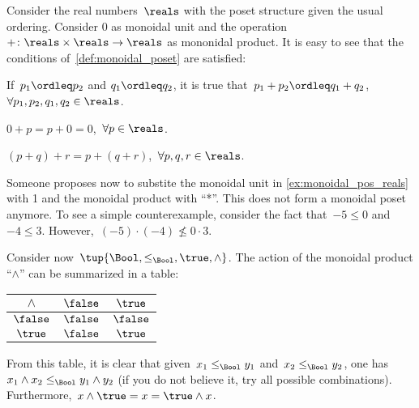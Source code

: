 \begin{example}
    \label{ex:monoidal_pos_reals}
    Consider the real numbers~$\reals$ with the poset structure given the usual ordering. Consider 0 as monoidal unit and the operation~$+\colon \reals\times \reals\to \reals$ as mononidal product. It is easy to see that the conditions of~\cref{def:monoidal_poset} are satisfied:
    \begin{compactenum}[(a)]
        \item If~$p_1\ordleq p_2$ and $q_1\ordleq q_2$, it is true that~$p_1+p_2\ordleq q_1+q_2$,~$\forall p_1,p_2,q_1,q_2\in \reals$.
        \item $0+p=p+0=0$,~$\forall p\in \reals$.
        \item $(p+q)+r=p+(q+r)$,~$\forall p,q,r\in \reals$.
    \end{compactenum}
\end{example}

\begin{example}
    Someone proposes now to substite the monoidal unit in \cref{ex:monoidal_pos_reals} with 1 and the monoidal product with ``*''. This does not form a monoidal poset anymore. To see a simple counterexample, consider the fact that~$-5\leq 0$ and~$-4\leq 3$. However,~$(-5)\cdot (-4) \nleq 0 \cdot 3$.
\end{example}

\begin{example}
    Consider now~$\tup{\Bool,\leq_{\Bool},\true,\wedge}$. The action of the monoidal product ``$\wedge$'' can be summarized in a table:
    \begin{center}
        \begin{tabular}{c|cc}
            $\wedge$ & $\false$ & $\true$  \\
            \hline
            $\false$ & $\false$ & $\false$ \\
            $\true$  & $\false$ & $\true$
        \end{tabular}
    \end{center}
    From this table, it is clear that given~$x_1\leq_{\Bool}y_1$ and~$x_2\leq_{\Bool} y_2$, one has~$x_1\wedge x_2\leq_{\Bool} y_1\wedge y_2$ (if you do not believe it, try all possible combinations). Furthermore,~$x\wedge \true=x=\true \wedge x$.
\end{example}
